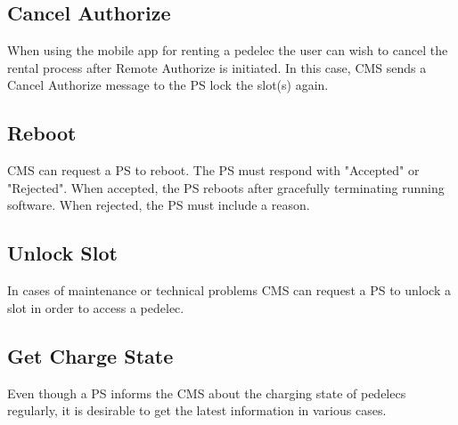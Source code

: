 \subsection{Cancel Authorize}

When using the mobile app for renting a pedelec the user can wish to cancel the rental process after Remote Authorize is initiated. In this case, \acs{CMS} sends a Cancel Authorize message to the \acs{PS} lock the slot(s) again.

\subsection{Reboot}

\acs{CMS} can request a \acs{PS} to reboot. The \acs{PS} must respond with "Accepted" or "Rejected". When accepted, the \acs{PS} reboots after gracefully terminating running software. When rejected, the \acs{PS} must include a reason.

\subsection{Unlock Slot}

In cases of maintenance or technical problems \acs{CMS} can request a \acs{PS} to unlock a slot in order to access a pedelec.

\subsection{Get Charge State}

Even though a \acs{PS} informs the \acs{CMS} about the charging state of pedelecs regularly, it is desirable to get the latest information in various cases.